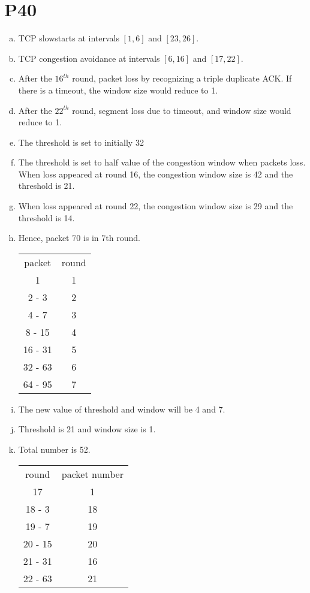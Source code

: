 \documentclass[a4paper, 11pt]{article}
\begin{document}
\section*{P40}
\begin{enumerate}[(a)]
	\item TCP slowstarts at intervals $[1, 6]$ and $[23, 26]$.
	\item TCP congestion avoidance at intervals $[6, 16]$ and $[17, 22]$.
	\item After the $16^{th}$ round, packet loss by recognizing a triple duplicate ACK. If there is a timeout, the window size would reduce to 1.
	\item After the $22^{th}$ round, segment loss due to timeout, and window size would reduce to 1.
	\item The threshold is set to initially 32
	\item The threshold is set to half value of the congestion window when packets loss. When loss appeared at round 16, the congestion window size is 42 and the threshold is 21.
	\item When loss appeared at round 22, the congestion window size is 29 and the threshold is 14.
	\item Hence, packet 70 is in 7th round. \\
	\begin{tabular}{c c}
		packet & round \\
		1 & 1 \\
		2 - 3 & 2\\
		4 - 7 & 3\\
		8 - 15 & 4\\
		16 - 31 & 5 \\
		32 - 63 & 6 \\
		64 - 95 & 7 \\
	\end{tabular} 
	\item The new value of threshold and window will be 4 and 7.
	\item Threshold is 21 and window size is 1.
	\item Total number is 52. \\
	\begin{tabular}{c c}
		round & packet number \\
		17 & 1 \\
	 	18 - 3 & 18\\
		19 - 7 & 19\\
		20 - 15 & 20\\
		21 - 31 & 16 \\
		22 - 63 & 21 \\
	\end{tabular} 
	
\end{enumerate}
\end{document}
